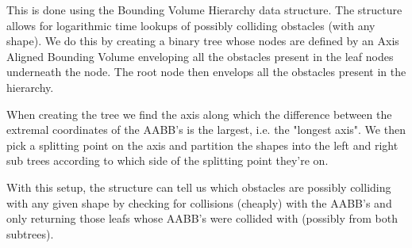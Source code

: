 \documentclass[10pt,a4paper]{article}
\begin{document}
This is done using the Bounding Volume Hierarchy data structure. The structure allows for logarithmic time lookups of possibly colliding obstacles (with any shape).
We do this by creating a binary tree whose nodes are defined by an Axis Aligned Bounding Volume enveloping all the obstacles present in the leaf nodes underneath the node.
The root node then envelops all the obstacles present in the hierarchy.
\par
When creating the tree we find the axis along which the difference between the extremal coordinates of the AABB's is the largest, i.e. the "longest axis".
We then pick a splitting point on the axis and partition the shapes into the left and right sub trees according to which side of the splitting point they're on.
\par 
With this setup, the structure can tell us which obstacles are possibly colliding with any given shape by checking for collisions (cheaply) with the AABB's and only returning those leafs whose AABB's were collided with (possibly from both subtrees).
\end{document}
